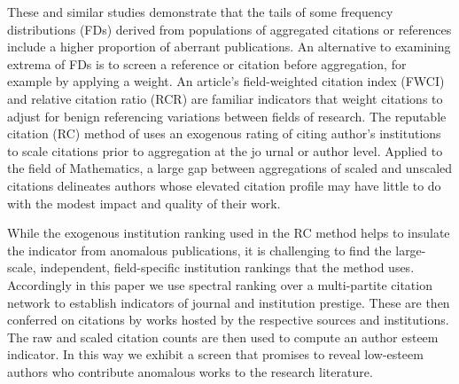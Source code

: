 \documentclass[10pt]{article}
\begin{document}
These and similar studies demonstrate that the tails of some frequency distributions (FDs) derived from populations of aggregated citations or references include a higher proportion of aberrant publications. An alternative to examining extrema of FDs is to screen a reference or citation before aggregation, for example by applying a weight.  An article's field-weighted citation index (FWCI) and relative citation ratio (RCR) are familiar indicators that weight citations to adjust for benign referencing variations between fields of research. The reputable citation (RC) method of \cite{safonScreeningArticlesCitation2025} uses an exogenous rating of citing author's institutions to scale citations prior to aggregation at the jo%
%
urnal or author level. Applied to the field of Mathematics, a large gap between aggregations of scaled and unscaled citations delineates authors whose elevated citation profile may have little to do with the modest impact and quality of their work.

While the exogenous institution ranking used in the RC method helps to insulate the indicator from anomalous publications, it is challenging to find the large-scale, independent, field-specific institution rankings that the method uses. Accordingly in this paper we use spectral ranking over a multi-partite citation network to establish indicators of journal and institution prestige. These are then conferred on citations by works hosted by the respective sources and institutions. The raw and scaled citation counts are then used to compute an author esteem indicator. In this way we exhibit a screen that promises to reveal low-esteem authors who contribute anomalous works to the research literature.
\end{document}
